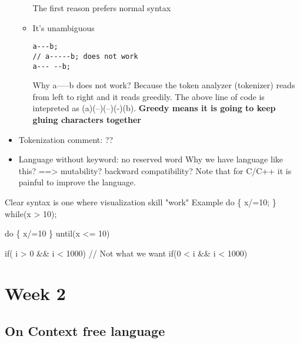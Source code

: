 \documentclass[11pt]{article}
\begin{document}
\begin{itemize}
\begin{itemize}
The first reason prefers normal syntax

\item It's unambiguous
\begin{verbatim}
a---b;
// a-----b; does not work
a--- --b;
\end{verbatim}
Why a-----b does not work?
Because the token analyzer (tokenizer) reads from left to right and it reads
greedily. The above line of code is intepreted as (a)(--)(--)(-)(b).
\textbf{Greedy means it is going to keep gluing characters together}
\end{itemize}
\end{itemize}
\begin{itemize}
\item Tokenization
comment: ??

\item Language without keyword: no reserved word
Why we have language like this? ==> mutability? backward compatibility?
Note that for C/C++ it is painful to improve the language.
\end{itemize}

Clear syntax is one where visualization skill "work"
Example
do \{
   x/=10;
\} while(x > 10);

do \{
  x/=10
\} until(x <= 10)

if( i > 0 \&\& i < 1000) // Not what we want
if(0 < i \&\& i < 1000)

\section{Week 2}
\label{sec:orgb0b9746}
\subsection{On Context free language}
\label{sec:org2ee43c3}
\end{document}
